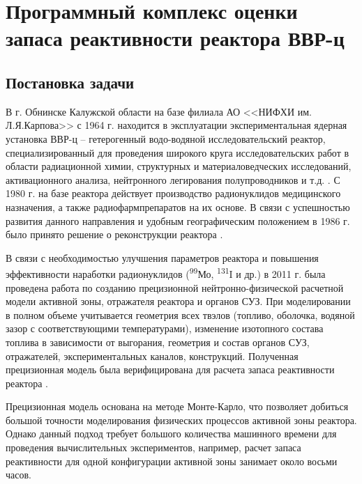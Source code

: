 \chapter{Программный комплекс оценки запаса реактивности реактора ВВР-ц}

\section{Постановка задачи}

В г. Обнинске Калужской области на базе филиала АО <<НИФХИ им. Л.Я.Карпова>> с 1964 г. находится в эксплуатации экспериментальная ядерная установка ВВР-ц -- гетерогенный водо-водяной исследовательский реактор, специализированный для проведения широкого круга исследовательских работ в области радиационной химии, структурных и материаловедческих исследований, активационного анализа, нейтронного легирования полупроводников и т.д. \cite{wwrc-2008}. 
С 1980 г. на базе реактора действует производство радионуклидов медицинского назначения, а также радиофармпрепаратов на их основе. В связи с успешностью развития данного направления и удобным географическим положением в 1986 г. было принято решение о реконструкции реактора \cite{presice-model-2011}.

В связи с необходимостью улучшения параметров реактора и повышения эффективности наработки радионуклидов (\textsuperscript{99}Мо, \textsuperscript{131}I и др.) в 2011 г. была проведена работа по созданию прецизионной нейтронно-физической расчетной модели активной зоны, отражателя реактора и органов СУЗ. 
При моделировании в полном объеме учитывается геометрия всех твэлов (топливо, оболочка, водяной зазор с соответствующими температурами), изменение изотопного состава топлива в зависимости от выгорания, геометрия и состав органов СУЗ, отражателей, экспериментальных каналов, конструкций.
Полученная прецизионная модель была верифицирована для расчета запаса реактивности реактора \cite{presice-model-2011}.

Прецизионная модель основана на методе Монте-Карло, что позволяет добиться большой точности моделирования физических процессов активной зоны реактора. 
Однако данный подход требует большого количества машинного времени для проведения вычислительных экспериментов, например, расчет запаса реактивности для одной конфигурации активной зоны занимает около восьми часов.

